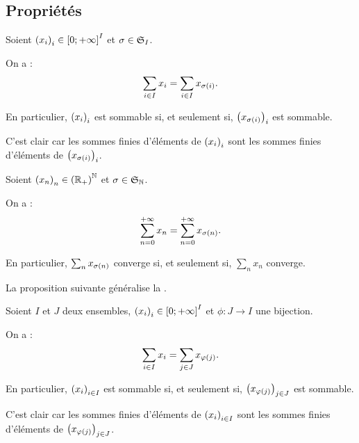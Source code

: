 \subsection{Propriétés}

\begin{prop}
Soient \(\paren{x_i}_i\in\intervii{0}{\pinf}^{I}\) et \(\sigma\in\S{I}\).

On a : \[\sum_{i\in I}x_i=\sum_{i\in I}x_{\sigma\paren{i}}.\]

En particulier, \(\paren{x_i}_i\) est sommable si, et seulement si, \(\paren{x_{\sigma\paren{i}}}_i\) est sommable.
\end{prop}

\begin{dem}
C'est clair car les sommes finies d'éléments de \(\paren{x_i}_i\) sont les sommes finies d'éléments de \(\paren{x_{\sigma\paren{i}}}_i\).
\end{dem}

\begin{cor}
Soient \(\paren{x_n}_n\in\paren{\Rp}^\N\) et \(\sigma\in\S{\N}\).

On a : \[\sum_{n=0}^{\pinf}x_n=\sum_{n=0}^{\pinf}x_{\sigma\paren{n}}.\]

En particulier, \(\sum_nx_{\sigma\paren{n}}\) converge si, et seulement si, \(\sum_nx_n\) converge.
\end{cor}

\begin{rem}
La proposition suivante généralise la .
\end{rem}

\begin{prop}
Soient \(I\) et \(J\) deux ensembles, \(\paren{x_i}_i\in\intervii{0}{\pinf}^I\) et \(\phi:J\to I\) une bijection.

On a : \[\sum_{i\in I}x_i=\sum_{j\in J}x_{\phi\paren{j}}.\]

En particulier, \(\paren{x_i}_{i\in I}\) est sommable si, et seulement si, \(\paren{x_{\phi\paren{j}}}_{j\in J}\) est sommable.
\end{prop}

\begin{dem}
C'est clair car les sommes finies d'éléments de \(\paren{x_i}_{i\in I}\) sont les sommes finies d'éléments de \(\paren{x_{\phi\paren{j}}}_{j\in J}\).
\end{dem}

